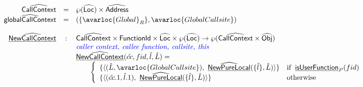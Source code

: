 \[
\begin{array}{rcl}
\abs{CallContext} & = & \powerset{\aLoc} \times \abs{Address} \\
\abs{globalCallContext} & = & (\{ \avarloc{Global}_R \}, \avarloc{GlobalCallsite}) \\
\\

\ahf{NewCallContext} & : & \abs{CallContext} \times \SF{FunctionId} \times \abs{Loc} \times \powerset{\abs{Loc}} \rightarrow \powerset{\abs{CallContext} \times \abs{Obj}} \\
& & \comment{\inblue caller context, callee function, callsite, this}  \\
& & \ahf{NewCallContext}(\hat{cc}, fid, \hat{l}, \hat{L}) = \\
& & \quad\quad \left\{
       \begin{array}{ll}
         \{ \langle (\hat{L}, \avarloc{GlobalCallsite}), ~ \ahf{NewPureLocal}(\{\hat{l}\}, \hat{L}) \rangle \} & \ifc{\chf{isUserFunction}_P(fid)} \\
         \{ \langle (\hat{cc}.1, \hat{l}.1), ~ \ahf{NewPureLocal}(\{\hat{l}\}, \hat{L}) \rangle \} & \owc \\
       \end{array}
     \right.\\
\end{array}
\]


\newpage
